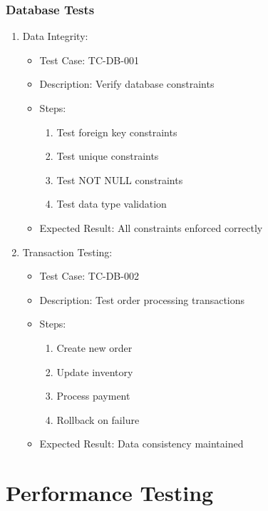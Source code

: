 \subsubsection{Database Tests}
\begin{enumerate}
    \item Data Integrity:
    \begin{itemize}
        \item Test Case: TC-DB-001
        \item Description: Verify database constraints
        \item Steps:
        \begin{enumerate}
            \item Test foreign key constraints
            \item Test unique constraints
            \item Test NOT NULL constraints
            \item Test data type validation
        \end{enumerate}
        \item Expected Result: All constraints enforced correctly
    \end{itemize}

    \item Transaction Testing:
    \begin{itemize}
        \item Test Case: TC-DB-002
        \item Description: Test order processing transactions
        \item Steps:
        \begin{enumerate}
            \item Create new order
            \item Update inventory
            \item Process payment
            \item Rollback on failure
        \end{enumerate}
        \item Expected Result: Data consistency maintained
    \end{itemize}
\end{enumerate}

\section{Performance Testing}
